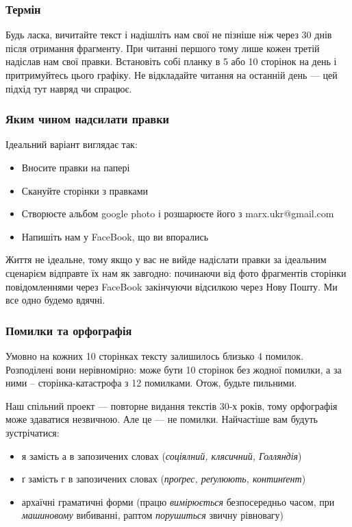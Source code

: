 \documentclass{kapital}
\begin{document}
  \thispagestyle{empty}

  \subsubsection*{Термін}

  Будь ласка, вичитайте текст і надішліть нам свої не пізніше ніж через 30 днів після отримання фрагменту.
  При читанні першого тому лише кожен третій надіслав нам свої правки.
  Встановіть собі планку в 5 або 10 сторінок на день і притримуйтесь цього 
  графіку. Не відкладайте читання на останній день — цей підхід тут навряд чи спрацює.

  \subsubsection*{Яким чином надсилати правки}

  Ідеальний варіант виглядає так:
  \begin{itemize}
  \item Вносите правки на папері
  \item Скануйте сторінки з правками
  \item Створюєте альбом google photo і розшарюєте його з marx.ukr@gmail.com
  \item Напишіть нам у FaceBook, що ви впорались
  \end{itemize}

  \noindent{}Життя не ідеальне, тому якщо у вас не вийде надіслати правки за ідеальним
  сценарієм відправте їх нам як завгодно: починаючи від фото фрагментів 
  сторінки повідомленнями через FaceBook закінчуючи відсилкою через Нову Пошту. 
  Ми все одно будемо вдячні.

  \subsubsection*{Помилки та орфографія}

  Умовно на кожних 10 сторінках тексту залишилось близько 4 помилок. 
  Розподілені вони нерівномірно: може бути 10 сторінок без жодної помилки, 
  а за ними – сторінка-катастрофа з 12 помилками. Отож, будьте пильними.

  \smallskip
  \noindent{}Наш спільний проект — повторне видання текстів 30-х років, тому орфографія
  може здаватися незвичною. Але це — не помилки. Найчастіше вам будуть
  зустрічатися:
  \begin{itemize}
  \item я замість а в запозичених словах (\emph{соціялний, клясичний, Голляндія})
  \item ґ замість г в запозичених словах (\emph{проґрес, реґулюють, континґент})
  \item архаїчні граматичні форми (працю \emph{вимірюється} безпосередньо часом, при \emph{машиновому} вибиванні, раптом \emph{порушиться} звичну рівновагу)
  \end{itemize}
\end{document}
